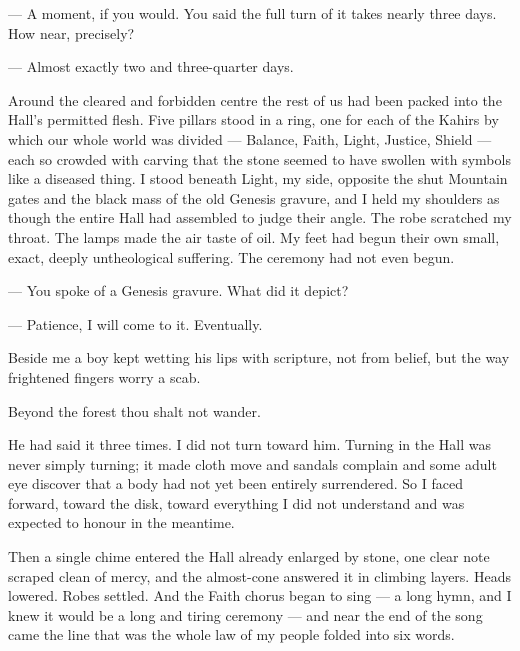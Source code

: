 \begin{room}

--- A moment, if you would. You said the full turn of it takes nearly three days. How near, precisely?

--- Almost exactly two and three-quarter days.

\end{room}

Around the cleared and forbidden centre the rest of us had been packed into the Hall's permitted flesh. 
Five pillars stood in a ring, one for each of the Kahirs by which our whole world was divided --- Balance, Faith, Light, Justice, Shield --- each so crowded 
with carving that the stone seemed to have swollen with symbols like a diseased thing. 
I stood beneath Light, my side, opposite the shut Mountain gates and the black mass of the old Genesis gravure, 
and I held my shoulders as though the entire Hall had assembled to judge their angle. 
The robe scratched my throat. 
The lamps made the air taste of oil. 
My feet had begun their own small, exact, deeply untheological suffering. 
The ceremony had not even begun.\par

\begin{room}

--- You spoke of a Genesis gravure. What did it depict?

--- Patience, I will come to it. Eventually.

\end{room}

Beside me a boy kept wetting his lips with scripture, not from belief, but the way frightened fingers worry a scab.\par

\begin{scripture}
Beyond the forest thou shalt not wander.
\end{scripture}

He had said it three times. 
I did not turn toward him. 
Turning in the Hall was never simply turning; it made cloth move and sandals complain and some adult eye discover that a body had not yet been entirely surrendered. 
So I faced forward, toward the disk, toward everything I did not understand and was expected to honour in the meantime.\par

Then a single chime entered the Hall already enlarged by stone, one clear note scraped clean of mercy, and the almost-cone answered it in climbing layers. 
Heads lowered. 
Robes settled. 
And the Faith chorus began to sing --- a long hymn, and I knew it would be a long and tiring ceremony --- and near the end of the song came the line 
that was the whole law of my people folded into six words.\par

